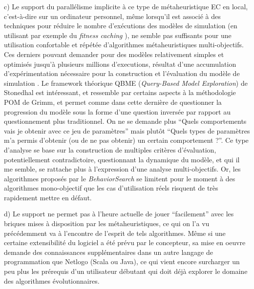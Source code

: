 c) Le support du parallélisme implicite à ce type de métaheuristique EC en local, c'est-à-dire sur un ordinateur personnel, même lorsqu'il est associé à des techniques pour réduire le nombre d'exécutions des modèles de simulation (en utilisant par exemple du \textit{fitness caching} \autocite[245]{Stonedahl2011a}), ne semble pas suffisants pour une utilisation confortable et répétée d'algorithmes métaheuristiques multi-objectifs. Ces derniers pouvant demander pour des modèles relativement simples et optimisés jusqu'à plusieurs millions d'executions, résultat d'une accumulation d'expérimentation nécessaire pour la construction et l'évaluation du modèle de simulation \autocites{Schmitt2014, Cottineau2014b}. Le framework théorique QBME (\textit{Query-Based Model Exploration}) de Stonedhal est intéressant, et ressemble par certains aspects à la méthodologie POM de Grimm, et permet comme dans cette dernière de questionner la progression du modèle sous la forme d'une question inversée par rapport au questionnement plus traditionnel. On ne se demande plus \enquote{Quels comportements vais je obtenir avec ce jeu de paramètres} mais plutôt \enquote{Quels types de paramètres m'a permis d'obtenir (ou de ne pas obtenir) un certain comportement ?}. Ce type d'analyse se base sur la construction de multiples critères d'évaluation, potentiellement contradictoire, questionnant la dynamique du modèle, et qui il me semble, se rattache plus à l'expression d'une analyse multi-objectifs. Or, les algorithmes proposés par le \textit{BehaviorSearch} se limitent pour le moment à des algorithmes mono-objectif que les cas d'utilisation réels risquent de très rapidement mettre en défaut.

d) Le support ne permet pas à l'heure actuelle de jouer \enquote{facilement} avec les briques mises à disposition par les métaheuristiques, ce qui on l'a vu précédemment va à l'encontre de l'esprit de tels algorithmes. Même si une certaine extensibilité du logiciel a été prévu par le concepteur, sa mise en oeuvre demande des connaissances supplémentaires dans un autre langage de programmation que Netlogo (Scala ou Java), ce qui vient encore surcharger un peu plus les prérequis d'un utilisateur débutant qui doit déjà explorer le domaine des algorithmes évolutionnaires.

